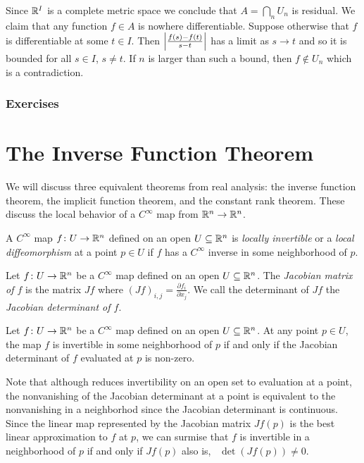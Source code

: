 \documentclass[letterpaper, 11pt, oneside]{book}
\begin{document}
\begin{pf}
  Since $\mathbb{R}^{I}$ is a complete metric space  we conclude that $A = \bigcap_{n} U_{n}$ is residual.
  We claim that any function $f \in A$ is nowhere differentiable.
  Suppose otherwise that $f$ is differentiable at some $t \in I$.
  Then $\abs{\frac{f(s) - f(t)}{s - t}}$ has a limit as $s \to t$ and so it is bounded for all $s \in I$, $s \neq t$.
  If $n$ is larger than such a bound, then $f \notin U_{n}$ which is a contradiction.
\end{pf}

\clearpage

\subsection*{Exercises}

\clearpage

\chapter{The Inverse Function Theorem}

We will discuss three equivalent theorems from real analysis: the inverse function theorem, the implicit function theorem, and the constant rank theorem.
These discuss the local behavior of a $C^{\infty}$ map from $\mathbb{R}^{n} \to \mathbb{R}^{n}$.

\begin{defn}
  A $C^{\infty}$ map $f\colon U \to \mathbb{R}^{n}$ defined on an open $U \subseteq \mathbb{R}^{n}$ is \emph{locally invertible} or a \emph{local diffeomorphism} at a point $p \in U$ if $f$ has a $C^{\infty}$ inverse in some neighborhood of $p$.
\end{defn}

\begin{defn}[Jacobian]
  Let $f\colon U \to \mathbb{R}^{n}$ be a $C^{\infty}$ map defined on an open $U \subseteq \mathbb{R}^{n}$.
  The \emph{Jacobian matrix of $f$} is the matrix $Jf$ where $(Jf)_{i, j} = \frac{\partial f_{i}}{\partial x_{j}}$.
  We call the determinant of $Jf$ the \emph{Jacobian determinant of $f$}.
\end{defn}

\begin{thrm}\label{thrm: inverse_func}
  Let $f\colon U \to \mathbb{R}^{n}$ be a $C^{\infty}$ map defined on an open $U \subseteq \mathbb{R}^{n}$.
  At any point $p \in U$, the map $f$ is invertible in some neighborhood of $p$ if and only if the Jacobian determinant of $f$ evaluated at $p$ is non-zero.
\end{thrm}
Note that although  reduces invertibility on an open set to evaluation at a point, the nonvanishing of the Jacobian determinant at a point is equivalent to the nonvanishing in a neighborhod since the Jacobian determinant is continuous.
Since the linear map represented by the Jacobian matrix $Jf(p)$ is the best linear approximation to $f$ at $p$, we can surmise that $f$ is invertible in a neighborhood of $p$ if and only if $Jf(p)$ also is, \ie\ $\det(Jf(p)) \neq 0$.
\end{document}
